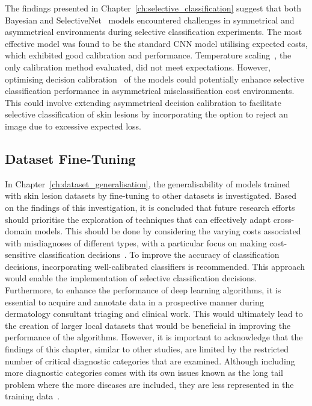 The findings presented in Chapter~\ref{ch:selective_classification} suggest that both Bayesian and SelectiveNet~\citep{geifman2019selectivenet} models encountered challenges in symmetrical and asymmetrical environments during selective classification experiments. The most effective model was found to be the standard CNN model utilising expected costs, which exhibited good calibration and performance. Temperature scaling~\citep{guo2017calibration}, the only calibration method evaluated, did not meet expectations. However, optimising decision calibration~\citep{zhao2021calibrating} of the models could potentially enhance selective classification performance in asymmetrical misclassification cost environments. This could involve extending asymmetrical decision calibration to facilitate selective classification of skin lesions by incorporating the option to reject an image due to excessive expected loss.

\subsection{Dataset Fine-Tuning}
In Chapter~\ref{ch:dataset_generalisation}, the generalisability of models trained with skin lesion datasets by fine-tuning to other datasets is investigated. Based on the findings of this investigation, it is concluded that future research efforts should prioritise the exploration of techniques that can effectively adapt cross-domain models. This should be done by considering the varying costs associated with misdiagnoses of different types, with a particular focus on making cost-sensitive classification decisions~\citep{guan2021domain,carse2021robust}. To improve the accuracy of classification decisions, incorporating well-calibrated classifiers is recommended. This approach would enable the implementation of selective classification decisions. Furthermore, to enhance the performance of deep learning algorithms, it is essential to acquire and annotate data in a prospective manner during dermatology consultant triaging and clinical work. This would ultimately lead to the creation of larger local datasets that would be beneficial in improving the performance of the algorithms. However, it is important to acknowledge that the findings of this chapter, similar to other studies, are limited by the restricted number of critical diagnostic categories that are examined. Although including more diagnostic categories comes with its own issues known as the long tail problem where the more diseases are included, they are less represented in the training data~\citep{roy2022does}.